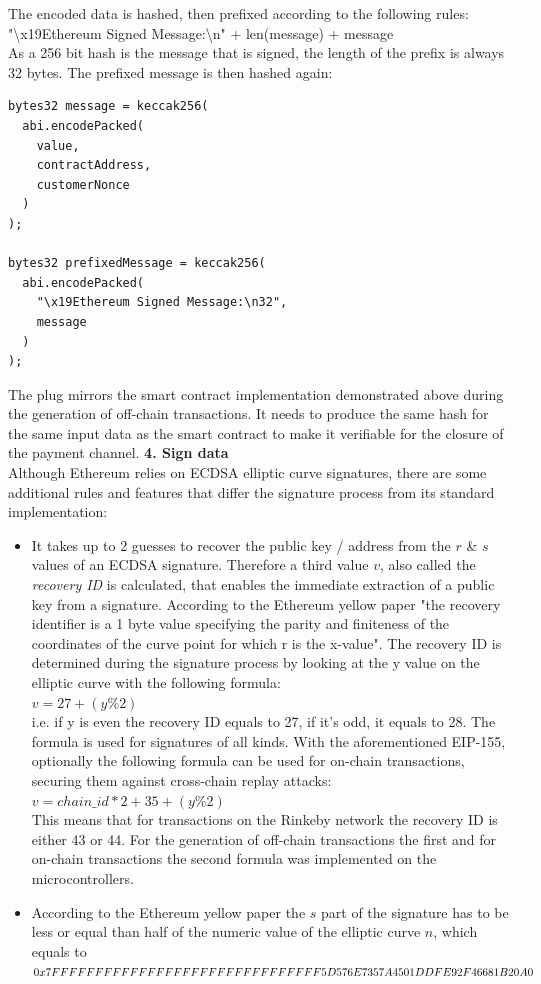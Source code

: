 The encoded data is hashed, then prefixed according to the following rules:
\\
"\textbackslash x19Ethereum Signed Message:\textbackslash n" + len(message) + message
\\
As a 256 bit hash is the message that is signed, the length of the prefix is always 32 bytes.
The prefixed message is then hashed again:
\\
\begin{lstlisting}[language=Solidity, numbers=none]
bytes32 message = keccak256(
  abi.encodePacked(
    value,
    contractAddress,
    customerNonce
  )
);

bytes32 prefixedMessage = keccak256(
  abi.encodePacked(
    "\x19Ethereum Signed Message:\n32",
    message
  )
);
\end{lstlisting}
The plug mirrors the smart contract implementation demonstrated above during the generation of off-chain transactions.
It needs to produce the same hash for the same input data as the smart contract to make it verifiable for the closure of the payment channel.
\newpage
\textbf{4. Sign data}\\
Although Ethereum relies on ECDSA elliptic curve signatures, there are some additional rules and features that differ the signature process from its standard implementation:
\begin{itemize}
  \item It takes up to 2 guesses to recover the public key / address from the $r$ \& $s$ values of an ECDSA signature.
  Therefore a third value $v$, also called the \textit{recovery ID} is calculated, that enables the immediate extraction of a public key from a signature.
  According to the Ethereum yellow paper\cite{ethereum-yellow-paper} "the recovery identifier is a 1 byte value specifying the parity and finiteness of the coordinates of the curve point for which r is the x-value".
  The recovery ID is determined during the signature process by looking at the y value on the elliptic curve with the following formula:
  \\
  $v = 27 + (y \% 2)$
  \\
  i.e. if y is even the recovery ID equals to 27, if it's odd, it equals to 28.
  The formula is used for signatures of all kinds.
  With the aforementioned EIP-155, optionally the following formula can be used for on-chain transactions, securing them against cross-chain replay attacks:
  \\
  $v = chain\_id * 2 + 35 + (y \% 2)$
  \\
  This means that for transactions on the Rinkeby network the recovery ID is either 43 or 44.
  For the generation of off-chain transactions the first and for on-chain transactions the second formula was implemented on the microcontrollers.
  \item According to the Ethereum yellow paper\cite{ethereum-yellow-paper} the $s$ part of the signature has to be less or equal than half of the numeric value of the elliptic curve $n$, which equals to 
  $0x7FFFFFFFFFFFFFFFFFFFFFFFFFFF
  \\FFFF5D576E7357A4501DDFE92F46681B20A0$
\end{itemize}
